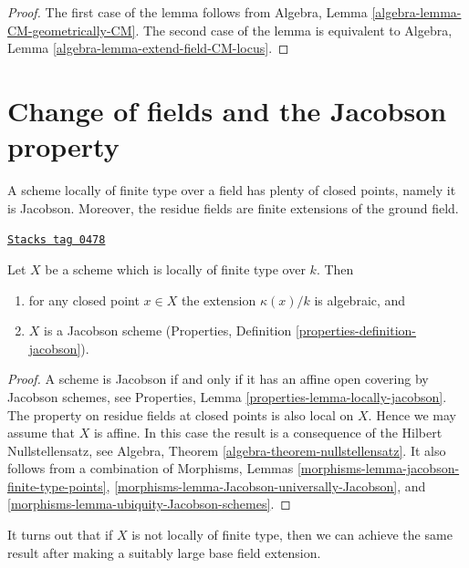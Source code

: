 \begin{proof}
The first case of the lemma follows from
Algebra, Lemma \ref{algebra-lemma-CM-geometrically-CM}.
The second case of the lemma is equivalent to
Algebra, Lemma \ref{algebra-lemma-extend-field-CM-locus}.
\end{proof}

\section{Change of fields and the Jacobson property}
\label{varieties-section-overfield}
A scheme locally of finite type over a field has plenty of closed
points, namely it is Jacobson. Moreover, the residue fields are
finite extensions of the ground field.

\begin{lemma}
\label{varieties-lemma-locally-finite-type-Jacobson}
\href{https://stacks.math.columbia.edu/tag/0478}{\texttt{Stacks tag 0478}}

Let $X$ be a scheme which is locally of finite type over $k$.
Then
\begin{enumerate}
\item for any closed point $x \in X$ the extension $\kappa(x)/k$
is algebraic, and
\item $X$ is a Jacobson scheme
(Properties, Definition \ref{properties-definition-jacobson}).
\end{enumerate}
\end{lemma}

\begin{proof}
A scheme is Jacobson if and only if it has an affine open covering
by Jacobson schemes, see
Properties, Lemma \ref{properties-lemma-locally-jacobson}.
The property on residue fields at closed points is also local on $X$.
Hence we may assume that $X$ is affine. In this case the result
is a consequence of the Hilbert Nullstellensatz, see
Algebra, Theorem \ref{algebra-theorem-nullstellensatz}.
It also follows from a combination of
Morphisms, Lemmas \ref{morphisms-lemma-jacobson-finite-type-points},
\ref{morphisms-lemma-Jacobson-universally-Jacobson}, and
\ref{morphisms-lemma-ubiquity-Jacobson-schemes}.
\end{proof}

It turns out that if $X$ is not locally of finite type, then we can
achieve the same result after making a suitably large base field extension.

